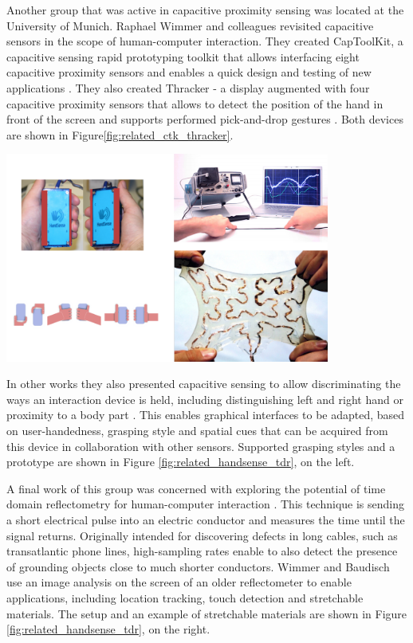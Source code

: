 Another group that was active in capacitive proximity sensing was located at the University of Munich. Raphael Wimmer and colleagues revisited capacitive sensors in the scope of human-computer interaction. They created CapToolKit, a capacitive sensing rapid prototyping toolkit that allows interfacing eight capacitive proximity sensors and enables a quick design and testing of new applications  \cite{Wimmer2007a}. They also created Thracker - a display augmented with four capacitive proximity sensors that allows to detect the position of the hand in front of the screen and supports performed pick-and-drop gestures \cite{Wimmer2006}. Both devices are shown in Figure\ref{fig:related_ctk_thracker}.

\begin{minipage}{\linewidth}
\centering
\includegraphics[width=0.8\textwidth]{images/related_handsense_tdr}
\label{fig:related_handsense_tdr}
\end{minipage}

In other works they also presented capacitive sensing to allow discriminating the ways an interaction device is held, including distinguishing left and right hand or proximity to a body part \cite{ wimmer2009handsense}. This enables graphical interfaces to be adapted, based on user-handedness, grasping style and spatial cues that can be acquired from this device in collaboration with other sensors. Supported grasping styles and a prototype are shown in Figure \ref{fig:related_handsense_tdr}, on the left.

A final work of this group was concerned with exploring the potential of time domain reflectometry for human-computer interaction \cite{wimmer2011modular}. This technique is sending a short electrical pulse into an electric conductor and measures the time until the signal returns. Originally intended for discovering defects in long cables, such as transatlantic phone lines, high-sampling rates enable to also detect the presence of grounding objects close to much shorter conductors. Wimmer and Baudisch use an image analysis on the screen of an older reflectometer to enable applications, including location tracking, touch detection and stretchable materials. The setup and an example of stretchable materials are shown in Figure \ref{fig:related_handsense_tdr}, on the right.

